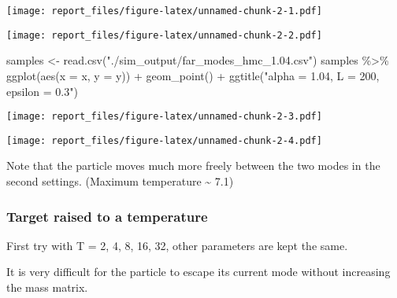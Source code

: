 \documentclass[
]{article}
\newenvironment{Shaded}{\begin{snugshade}}{\end{snugshade}}
\newcommand{\AttributeTok}[1]{\textcolor[rgb]{0.77,0.63,0.00}{#1}}
\newcommand{\FunctionTok}[1]{\textcolor[rgb]{0.00,0.00,0.00}{#1}}
\newcommand{\NormalTok}[1]{#1}
\newcommand{\OtherTok}[1]{\textcolor[rgb]{0.56,0.35,0.01}{#1}}
\newcommand{\SpecialCharTok}[1]{\textcolor[rgb]{0.00,0.00,0.00}{#1}}
\newcommand{\StringTok}[1]{\textcolor[rgb]{0.31,0.60,0.02}{#1}}
\begin{document}
\texttt{[image: report\_files/figure-latex/unnamed-chunk-2-1.pdf]}

\begin{Shaded}
\end{Shaded}

\texttt{[image: report\_files/figure-latex/unnamed-chunk-2-2.pdf]}

\begin{Shaded}
\begin{Highlighting}[]
\NormalTok{samples }\OtherTok{\textless{}{-}} \FunctionTok{read.csv}\NormalTok{(}\StringTok{"./sim\_output/far\_modes\_hmc\_1.04.csv"}\NormalTok{)}
\NormalTok{samples }\SpecialCharTok{\%\textgreater{}\%}
    \FunctionTok{ggplot}\NormalTok{(}\FunctionTok{aes}\NormalTok{(}\AttributeTok{x =}\NormalTok{ x, }\AttributeTok{y =}\NormalTok{ y)) }\SpecialCharTok{+} \FunctionTok{geom\_point}\NormalTok{() }\SpecialCharTok{+} \FunctionTok{ggtitle}\NormalTok{(}\StringTok{"alpha = 1.04, L = 200, epsilon = 0.3"}\NormalTok{)}
\end{Highlighting}
\end{Shaded}

\texttt{[image: report\_files/figure-latex/unnamed-chunk-2-3.pdf]}

\begin{Shaded}
\end{Shaded}

\texttt{[image: report\_files/figure-latex/unnamed-chunk-2-4.pdf]}

Note that the particle moves much more freely between the two modes in
the second settings. (Maximum temperature \textasciitilde{} 7.1)

\hypertarget{target-raised-to-a-temperature}{%
\subsubsection{Target raised to a
temperature}\label{target-raised-to-a-temperature}}

First try with T = 2, 4, 8, 16, 32, other parameters are kept the same.

It is very difficult for the particle to escape its current mode without
increasing the mass matrix.
\end{document}
